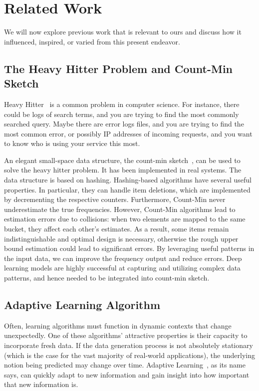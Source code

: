 \chapter{Related Work}
\label{chapter:related_work}

We will now explore previous work that is relevant to ours and discuss how it influenced, inspired, or varied from this present endeavor. 

\section{The Heavy Hitter Problem and Count-Min Sketch}

Heavy Hitter~\cite{sivaraman2017heavy} is a common problem in computer science. For instance, there could be logs of search terms, and you are trying to find the most commonly searched query. Maybe there are error logs files, and you are trying to find the most common error, or possibly IP addresses of incoming requests, and you want to know who is using your service this most.

An elegant small-space data structure, the count-min sketch~\cite{cormode2005improved}, can be used to solve the heavy hitter problem. It has been implemented in real systems. The data structure is based on hashing. Hashing-based algorithms have several useful properties. In particular, they can handle item deletions, which are implemented by decrementing the respective counters. Furthermore, Count-Min never underestimate the true frequencies. However, Count-Min algorithms lead to estimation errors due to collisions: when two elements are mapped to the same bucket, they affect each other's estimates. As a result, some items remain indistinguishable and optimal design is necessary, otherwise the rough upper bound estimation could lead to significant errors. By leveraging useful patterns in the input data, we can improve the frequency output and reduce errors. Deep learning models are highly successful at capturing and utilizing complex data patterns, and hence needed to be integrated into count-min sketch.


\section{Adaptive Learning Algorithm}

Often, learning algorithms must function in dynamic contexts that change unexpectedly. One of these algorithms' attractive properties is their capacity to incorporate fresh data. If the data generation process is not absolutely stationary (which is the case for the vast majority of real-world applications), the underlying notion being predicted may change over time. Adaptive Learning~\cite{botu2015adaptive}, as its name says, can quickly adapt to new information and gain insight into how important that new information is.

